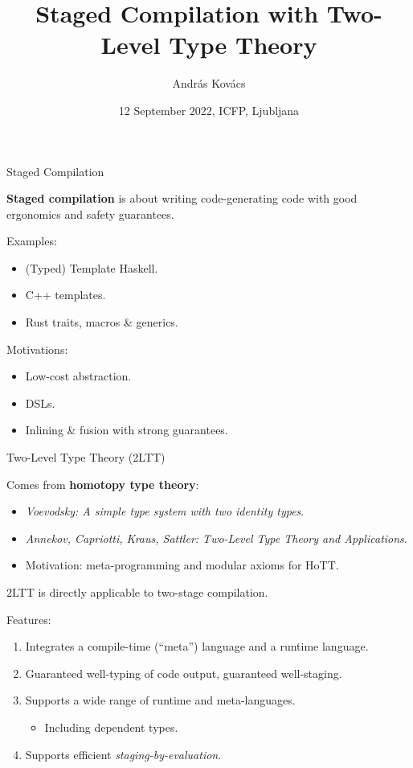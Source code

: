 \documentclass[dvipsnames,aspectratio=169]{beamer}
\title{Staged Compilation with Two-Level Type Theory}
\author{András Kovács}
\institute{
  {Eötvös Loránd University}
}
\date{12 September 2022, ICFP, Ljubljana}
\theoremstyle{remark}
\begin{document}
\frame{\titlepage}

\begin{frame}{Staged Compilation}

\begin{block}{}
\textbf{Staged compilation} is about writing code-generating code with good ergonomics
and safety guarantees.
\end{block}
\vspace{1em}
\pause

Examples:
\begin{itemize}
  \item (Typed) Template Haskell.
  \item C++ templates.
  \item Rust traits, macros \& generics.
\end{itemize}
\vspace{1em}
\pause

Motivations:
\begin{itemize}
  \item Low-cost abstraction.
  \item DSLs.
  \item Inlining \& fusion with strong guarantees.
\end{itemize}

\end{frame}

\begin{frame}{Two-Level Type Theory (2LTT)}

Comes from \textbf{homotopy type theory}:
\begin{itemize}
  \item \emph{Voevodsky: A simple type system with two identity types}.
  \item \emph{Annekov, Capriotti, Kraus, Sattler: Two-Level Type Theory and Applications}.
  \item Motivation: meta-programming and modular axioms for HoTT.
\end{itemize}
\vspace{1em}
\pause

2LTT is directly applicable to two-stage compilation.
\vspace{1em}
\pause

Features:
\begin{enumerate}
\item Integrates a compile-time (``meta'') language and a runtime language.
\pause
\item Guaranteed well-typing of code output, guaranteed well-staging.
\pause
\item Supports a wide range of runtime and meta-languages.
  \begin{itemize}
  \pause
  \item \alert{Including dependent types}.
  \end{itemize}
\pause
\item Supports efficient \emph{staging-by-evaluation}.
\end{enumerate}
\vspace{1em}
\pause
\end{frame}
\end{document}
